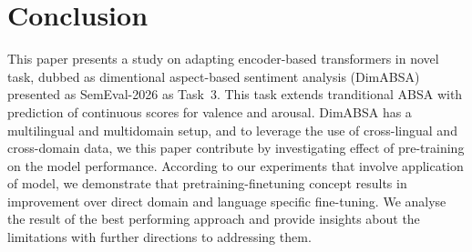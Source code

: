\documentclass[11pt]{article}
\begin{document}
\section{Conclusion}
\label{sec:conclusion}

This paper presents a study on adapting encoder-based transformers in novel task, dubbed as dimentional aspect-based sentiment analysis (DimABSA) presented as SemEval-2026 as Task~3.
This task extends tranditional ABSA with prediction of continuous scores for valence and arousal.
DimABSA has a multilingual and multidomain setup, and to leverage the use of cross-lingual and cross-domain data, we this paper contribute by investigating effect of pre-training on the model performance.
According to our experiments that involve application of \robertaBase{} model, we demonstrate that pretraining-finetuning concept results in \improvement{} improvement over direct domain and language specific fine-tuning.
We analyse the result of the best performing approach and provide insights about the limitations with further directions to addressing them.



\end{document}
